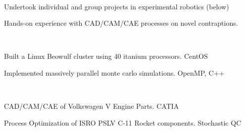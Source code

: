 \documentclass[]{deedy-resume-openfont}
\begin{document}
\begin{minipage}[t]{0.66\textwidth}
\\
\vspace{\topsep}
\begin{tightemize}
\item Undertook individual and group projects in experimental robotics \hfill{ \selectfont (below)}
\item Hands-on experience with CAD/CAM/CAE processes on novel contraptions.
\end{tightemize}
\sectionsep

\\
\vspace{\topsep}
\begin{tightemize}
\item Built a Linux Beowulf cluster using 40 itanium processors. \hfill{ \selectfont CentOS}
\item Implemented massively parallel monte carlo simulations. \hfill{ \selectfont OpenMP, C++}
\end{tightemize}
\sectionsep


\\
\vspace{\topsep}
\begin{tightemize}\item CAD/CAM/CAE of Volkswagen V Engine Parts. \hfill{ \selectfont CATIA}
\item Process Optimization of ISRO PSLV C-11 Rocket components. \hfill{ \selectfont Stochastic QC}
\end{tightemize}
\sectionsep




\end{minipage}
\end{document}
